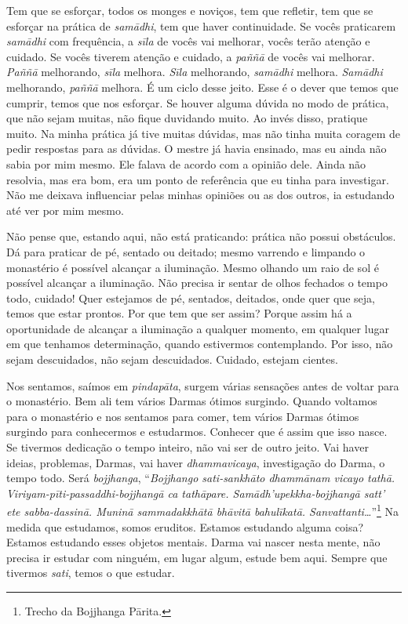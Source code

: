 Tem que se esforçar, todos os monges e noviços, tem que refletir,
tem que se esforçar na prática de \textit{samādhi}, tem que haver
continuidade. Se vocês praticarem \textit{samādhi} com frequência, a
\textit{sīla} de vocês vai melhorar, vocês terão atenção e cuidado.
Se vocês tiverem atenção e cuidado, a \textit{paññā} de vocês vai
melhorar. \textit{Paññā} melhorando, \textit{sīla} melhora.
\textit{Sīla} melhorando, \textit{samādhi} melhora.
\textit{Samādhi} melhorando, \textit{paññā} melhora. É um ciclo
desse jeito. Esse é o dever que temos que cumprir, temos que nos
esforçar. Se houver alguma dúvida no modo de prática, que não sejam
muitas, não fique duvidando muito. Ao invés disso, pratique muito. Na
minha prática já tive muitas dúvidas, mas não tinha muita coragem de
pedir respostas para as dúvidas. O mestre já havia ensinado, mas eu
ainda não sabia por mim mesmo. Ele falava de acordo com a opinião dele.
Ainda não resolvia, mas era bom, era um ponto de referência que eu
tinha para investigar. Não me deixava influenciar pelas minhas opiniões
ou as dos outros, ia estudando até ver por mim mesmo.

Não pense que, estando aqui, não está praticando: prática não possui
obstáculos. Dá para praticar de pé, sentado ou deitado; mesmo varrendo
e limpando o monastério é possível alcançar a iluminação. Mesmo olhando
um raio de sol é possível alcançar a iluminação. Não precisa ir sentar
de olhos fechados o tempo todo, cuidado! Quer estejamos de pé,
sentados, deitados, onde quer que seja, temos que estar prontos. Por
que tem que ser assim? Porque assim há a oportunidade de alcançar a
iluminação a qualquer momento, em qualquer lugar em que tenhamos
determinação, quando estivermos contemplando. Por isso, não sejam
descuidados, não sejam descuidados. Cuidado, estejam cientes. 

Nos sentamos, saímos em \textit{pindapāta}, surgem várias
sensações antes de voltar para o monastério. Bem ali tem vários Darmas
ótimos surgindo. Quando voltamos para o monastério e nos sentamos para
comer, tem vários Darmas ótimos surgindo para conhecermos e estudarmos.
Conhecer que é assim que isso nasce. Se tivermos dedicação o tempo
inteiro, não vai ser de outro jeito. Vai haver ideias, problemas,
Darmas, vai haver \textit{dhammavicaya}, investigação do Darma, o tempo
todo. Será \textit{bojjhanga}, “\textit{Bojjhango sati-sankhāto
dhammānam vicayo tathā. Viriyam-pīti-passaddhi-bojjhangā ca
tathāpare. Samādh’upekkha-bojjhangā satt’ ete sabba-dassinā.
Muninā sammadakkhātā bhāvitā bahulīkatā.
Sanvattanti\ldots{}}”\footnote{Trecho da Bojjhanga Pārita.} Na medida que
estudamos, somos eruditos. Estamos estudando alguma coisa? Estamos
estudando esses objetos mentais. Darma vai nascer nesta mente, não
precisa ir estudar com ninguém, em lugar algum, estude bem aqui. Sempre
que tivermos \textit{sati}, temos o que estudar. 

